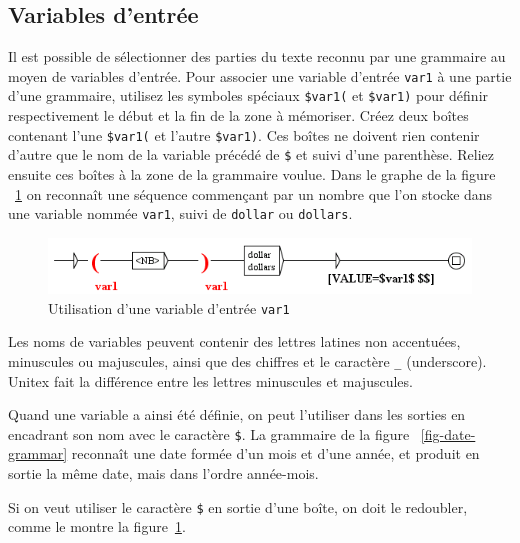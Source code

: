 
\subsection{Variables d'entrée}
\label{section-using-variables}
\index{\verb+$+}

Il est possible de sélectionner des parties du texte reconnu par une grammaire au moyen
de variables d'entrée. Pour associer une variable d'entrée \verb+var1+ à une partie d’une grammaire, utilisez
les symboles spéciaux \verb+$var1(+ et \verb+$var1)+ pour définir respectivement le début et
la fin de la zone à mémoriser. Créez deux boîtes contenant l’une \verb+$var1(+ et l’autre
\verb+$var1)+. Ces boîtes ne doivent rien contenir d’autre que le nom de la variable précédé de
 \verb+$+ et suivi d’une parenthèse. Reliez ensuite ces boîtes à la zone de la grammaire voulue.
 Dans le graphe de la figure ~\ref{fig-using-variable} on reconnaît une séquence commençant par
 un nombre que l’on stocke dans une variable nommée \verb+var1+, suivi de \verb+dollar+ ou
 \verb+dollars+.

\bigskip
\begin{figure}[h]
\begin{center}
\includegraphics[width=13.5cm]{resources/img/fig5-16.png}
\caption{Utilisation d’une variable d'entrée
\texttt{var1}\label{fig-using-variable}}
\end{center}
\end{figure}

\noindent Les noms de variables peuvent contenir des lettres latines non accentuées, minuscules
ou majuscules, ainsi que des chiffres et le caractère \verb+_+ (underscore).
\index{\verb+_+} Unitex fait la différence entre les lettres minuscules
et majuscules.

\bigskip
\noindent Quand une variable a ainsi été définie, on peut l’utiliser dans les sorties en encadrant
son nom avec le caractère \verb+$+.\index{\verb+$+} La grammaire de la figure
~\ref{fig-date-grammar} reconnaît une date formée d’un mois et d’une année,
 et produit en sortie la même date, mais dans l’ordre année-mois.

\noindent Si on veut utiliser le caractère \verb+$+ en sortie d'une boîte, on doit le
redoubler, comme le montre la figure~\ref{fig-using-variable}.

